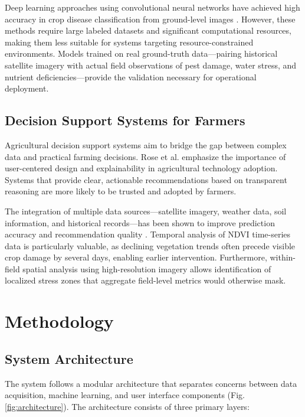 \documentclass[journal]{IEEEtran}
\begin{document}
Deep learning approaches using convolutional neural networks have achieved high accuracy in crop disease classification from ground-level images \cite{kamilaris2018deep}. However, these methods require large labeled datasets and significant computational resources, making them less suitable for systems targeting resource-constrained environments. Models trained on real ground-truth data—pairing historical satellite imagery with actual field observations of pest damage, water stress, and nutrient deficiencies—provide the validation necessary for operational deployment.

\subsection{Decision Support Systems for Farmers}

Agricultural decision support systems aim to bridge the gap between complex data and practical farming decisions. Rose et al. \cite{rose2016decision} emphasize the importance of user-centered design and explainability in agricultural technology adoption. Systems that provide clear, actionable recommendations based on transparent reasoning are more likely to be trusted and adopted by farmers.

The integration of multiple data sources—satellite imagery, weather data, soil information, and historical records—has been shown to improve prediction accuracy and recommendation quality \cite{wolfert2017big}. Temporal analysis of NDVI time-series data is particularly valuable, as declining vegetation trends often precede visible crop damage by several days, enabling earlier intervention. Furthermore, within-field spatial analysis using high-resolution imagery allows identification of localized stress zones that aggregate field-level metrics would otherwise mask.

\section{Methodology}

\subsection{System Architecture}

The system follows a modular architecture that separates concerns between data acquisition, machine learning, and user interface components (Fig. \ref{fig:architecture}). The architecture consists of three primary layers:
\end{document}
